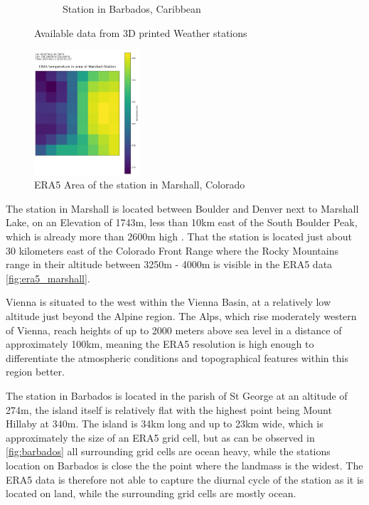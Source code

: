 \begin{figure}
\begin{subfigure}{0.672\textwidth}
        \caption{Station in Barbados, Caribbean}
        \label{fig:available_measurements_barbados}
    \end{subfigure}
    \caption{Available data from 3D printed Weather stations}
    \label{fig:weather_stations}
\end{figure}

\begin{figure}
    \centering
    \includegraphics[width=0.35\textwidth]{resources/images/Marshall_era5.png}
    \caption{ERA5 Area of the station in Marshall, Colorado}
    \label{fig:era5_marshall}
\end{figure}


The station in Marshall is located between Boulder and Denver next to Marshall Lake, on an Elevation of 1743m, less than 10km east of the South Boulder Peak, which is already more than 2600m high \cite{southboulderpeak}. That the station is located just about 30 kilometers east of the Colorado Front Range where the Rocky Mountains range in their altitude between 3250m - 4000m \cite{Williams1996} is visible in the ERA5 data \autoref{fig:era5_marshall}.

Vienna is situated to the west within the Vienna Basin, at a relatively low altitude just beyond the Alpine region. The Alps, which rise moderately western of Vienna, reach heights of up to 2000 meters above sea level in a distance of approximately 100km, meaning the ERA5 resolution is high enough to differentiate the atmospheric conditions and topographical features within this region better.

The station in Barbados is located in the parish of St George at an altitude of 274m, the island itself is relatively flat with the highest point being Mount Hillaby at 340m. The island is 34km long and up to 23km wide, which is approximately the size of an ERA5 grid cell, but as can be observed in \autoref{fig:barbados} all surrounding grid cells are ocean heavy, while the stations location on Barbados is close the the point where the landmass is the widest. The ERA5 data is therefore not able to capture the diurnal cycle of the station as it is located on land, while the surrounding grid cells are mostly ocean.

